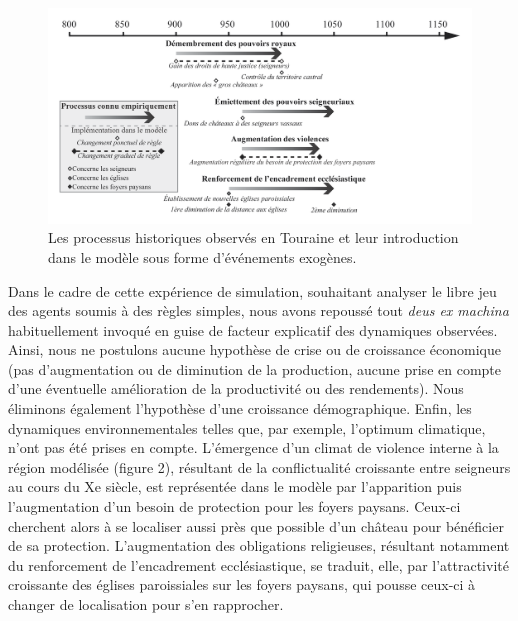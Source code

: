 \documentclass[12pt, a4paper, oneside]{book}
\begin{document}
	\begin{figure}[!h]
		\centering
		\includegraphics[width=1\linewidth]{src/Chapitre_TMD/Fig2}
		\caption{Les processus historiques observés en Touraine et leur introduction dans le modèle sous forme d’événements exogènes.}
		\label{fig:fig2}
	\end{figure}
	
	Dans le cadre de cette expérience de simulation, souhaitant analyser le libre jeu des agents soumis à des règles simples, nous avons repoussé tout \textit{deus ex machina} habituellement invoqué en guise de facteur explicatif des dynamiques observées.
	Ainsi, nous ne postulons aucune hypothèse de crise ou de croissance économique (pas d'augmentation ou de diminution de la production, aucune prise en compte d'une éventuelle amélioration de la productivité ou des rendements).
	Nous éliminons également l'hypothèse d'une croissance démographique.
	Enfin, les dynamiques environnementales telles que, par exemple, l'optimum climatique, n'ont pas été prises en compte.
	L'émergence d'un climat de violence interne à la région modélisée (figure 2), résultant de la conflictualité croissante entre seigneurs au cours du Xe siècle, est représentée dans le modèle par l'apparition puis l'augmentation d'un besoin de protection pour les foyers paysans.
	Ceux-ci cherchent alors à se localiser aussi près que possible d'un château pour bénéficier de sa protection.
	L'augmentation des obligations religieuses, résultant notamment du renforcement de l'encadrement ecclésiastique, se traduit, elle, par l'attractivité croissante des églises paroissiales sur les foyers paysans, qui pousse ceux-ci à changer de localisation pour s'en rapprocher.
	
\end{document}
